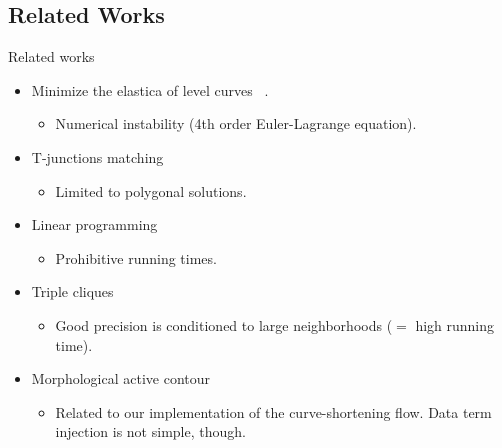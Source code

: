\subsection*{Related Works}

\begin{frame}
{Related works}

\begin{itemize}
	\item{Minimize the elastica of level curves~ .}
	\begin{itemize}
		\item{Numerical instability (4th order Euler-Lagrange equation).}
	\end{itemize}
	\item{T-junctions matching~}
	\begin{itemize}
		\item{Limited to polygonal solutions.}
	\end{itemize}
	\item{Linear programming~}
	\begin{itemize}
		\item{Prohibitive running times.}
	\end{itemize}
	\item{Triple cliques~}
	\begin{itemize}
		\item{Good precision is conditioned to large neighborhoods ($=$ high running time).}
	\end{itemize}
	\item{Morphological active contour~}
	\begin{itemize}
		\item{Related to our implementation of the curve-shortening flow. Data term injection is not simple, though.}
	\end{itemize}	
\end{itemize}
\end{frame}
